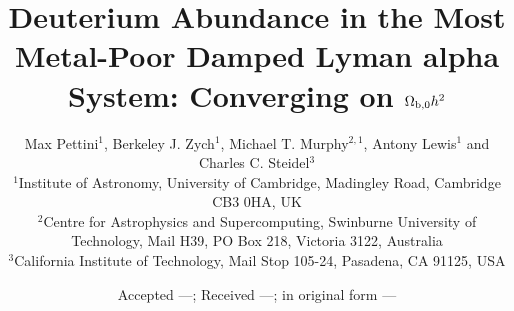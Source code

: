 \documentclass[useAMS,usenatbib]{mn2e}
\begin{document}

\newcommand{\lya}{Ly$\alpha$}
\newcommand{\heii}{He\textsc{ii}}
\newcommand{\hii}{H \textsc{ii}}
\newcommand{\hei}{He\textsc{i}}
\newcommand{\ion}[2]{[\textsc{#1}]#2}
\newcommand{\ha}{\ensuremath{\mathrm{H}\alpha}}
\newcommand{\hb}{\ensuremath{\mathrm{H}\beta}}
\newcommand{\nii}{{\ion{N ii}{6564}}}
\newcommand{\sii}{{\ion{S ii}{6716,6731}}}
\newcommand{\siii}{{\ion{S iii}{9069,9532}}}
\newcommand{\oiii}[1][5007]{{\ion{O iii}{#1}}}
\newcommand{\oii}{{\ion{O ii}{3727}}}
\newcommand{\ewha}{\ensuremath{\mathrm{EW(\ha)}}}
\newcommand{\dewha}{\ensuremath{\Delta \mathrm{EW}(\ha)}}
\newcommand{\ssfr}{SFR/M$_*$}
\newcommand{\HII}{H\textsc{ii}}
\newcommand{\apjs}{ApJS}
\newcommand{\apj}{ApJ}
\newcommand{\aj}{AJ}
\newcommand{\araa}{ARA\&A}
\newcommand{\apjl}{ApJL}
\newcommand{\nat}{Nature}
\newcommand{\pasp}{PASP}
\newcommand{\aap}{A\&A}
\newcommand{\mnras}{MNRAS}

\def\ltsima{$\; \buildrel < \over \sim \;$}
\def\simlt{\lower.5ex\hbox{\ltsima}}
\def\gtsima{$\; \buildrel > \over \sim \;$}
\def\simgt{\lower.5ex\hbox{\gtsima}}

\newcommand{\Om}{\Omega_{\rm m}}
\newcommand{\Omo}{\Omega_{\rm m,0}}
\newcommand{\Ob}{\Omega_{\rm b}}
\newcommand{\Obo}{\Omega_{\rm b,0}}

\newcommand{\beq}{\[}
\newcommand{\eeq}{\]}
\newcommand{\bneq}{\begin{equation}}
\newcommand{\eneq}{\end{equation}}


\title[D/H in the most metal-poor DLA]{Deuterium Abundance in the
Most Metal-Poor Damped Lyman alpha System: Converging on
$\Omega_{\rm b,0} h^2$%
}

\author[M. Pettini et al.]
       {Max Pettini$^1$, Berkeley J. Zych$^1$, Michael T. Murphy$^{2, 1}$,
        Antony Lewis$^1$ and
        \newauthor Charles C. Steidel$^3$\\
        $^1$Institute of Astronomy, University of Cambridge,
         Madingley Road, Cambridge CB3 0HA, UK\\
         $^2$Centre for Astrophysics and Supercomputing, Swinburne University
         of Technology, Mail H39, PO Box 218, Victoria 3122, Australia\\
	 $^3$California Institute of Technology, Mail Stop 105-24, Pasadena, CA 91125, USA
      }
\date{Accepted ---; Received ---; in original form ---}
\pagerange{\pageref{firstpage}--\pageref{lastpage}}
\end{document}
